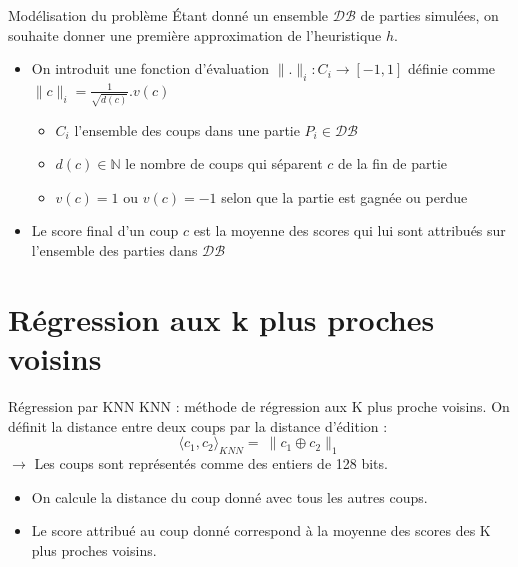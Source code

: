 \documentclass{beamer}
\begin{document}
\begin{frame}{Modélisation du problème}
    Étant donné un ensemble $\mathcal{DB}$ de parties simulées,
    on souhaite donner une première approximation de l'heuristique $h$.
    \begin{itemize}
        \item On introduit une fonction d'évaluation $\lVert.\rVert_i : C_i \to [-1, 1]$
        définie comme $\lVert c \rVert_i = \frac{1}{\sqrt{d(c)}}.v(c)$
        \begin{itemize}
            \item $C_i$ l'ensemble des coups dans une partie $P_i \in \mathcal{DB}$
            \item $d(c) \in \mathbb{N}$ le nombre de coups qui séparent $c$ de la fin de partie
            \item $v(c) = 1$ ou $v(c) = -1$ selon que la partie est gagnée ou perdue
        \end{itemize}
        \item Le score final d'un coup $c$ est la moyenne des scores qui lui sont attribués sur l'ensemble des parties dans $\mathcal{DB}$
    \end{itemize}
\end{frame}

{\section{Régression aux k plus proches voisins}}

\begin{frame}{Régression par KNN}
    KNN : méthode de régression aux \alert{K plus proche voisins}.
    On définit la distance entre deux coups par la \alert{distance d'édition} :
    $$ \langle c_1, c_2 \rangle_{KNN} = \ \rVert c_1 \oplus c_2 \lVert_1 $$
    $\rightarrow$ Les coups sont représentés comme des entiers de 128 bits.
    \begin{itemize}
        \item On calcule la distance du coup donné avec tous les autres coups.
        \item Le score attribué au coup donné correspond à \alert{la moyenne des scores} des K plus proches voisins.
    \end{itemize}
\end{frame}
\end{document}
